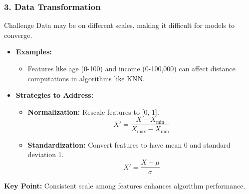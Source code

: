 \documentclass[aspectratio=169]{beamer}
\begin{document}
\begin{frame}[fragile]
  \frametitle{3. Data Transformation}
  \begin{block}{Challenge}
    Data may be on different scales, making it difficult for models to converge.
  \end{block}

  \begin{itemize}
    \item \textbf{Examples:}
      \begin{itemize}
        \item Features like age (0-100) and income (0-100,000) can affect distance computations in algorithms like KNN.
      \end{itemize}

    \item \textbf{Strategies to Address:}
      \begin{itemize}
        \item \textbf{Normalization:} Rescale features to [0, 1].
          \begin{equation}
            X' = \frac{X - X_{\text{min}}}{X_{\text{max}} - X_{\text{min}}}
          \end{equation}
        \item \textbf{Standardization:} Convert features to have mean 0 and standard deviation 1.
          \begin{equation}
            X' = \frac{X - \mu}{\sigma}
          \end{equation}
      \end{itemize}
  \end{itemize}

  \textbf{Key Point:} Consistent scale among features enhances algorithm performance.
\end{frame}
\end{document}
